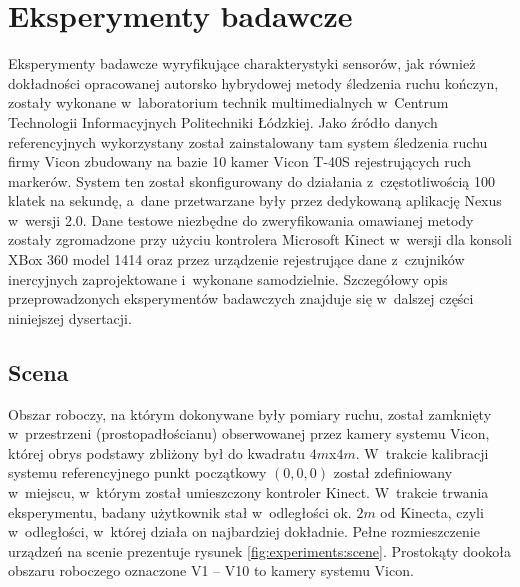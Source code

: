 \chapter{Eksperymenty badawcze}\label{chap:experiments}
Eksperymenty badawcze wyryfikujące charakterystyki sensorów, jak również dokładności opracowanej autorsko hybrydowej metody śledzenia ruchu kończyn, zostały wykonane w~laboratorium technik multimedialnych w~Centrum Technologii Informacyjnych Politechniki Łódzkiej. Jako źródło danych referencyjnych wykorzystany został zainstalowany tam system śledzenia ruchu firmy Vicon zbudowany na bazie 10 kamer Vicon T-40S  rejestrujących ruch markerów. System ten został skonfigurowany do działania z~częstotliwością 100 klatek na sekundę, a~dane przetwarzane były przez dedykowaną aplikację Nexus w~wersji 2.0. Dane testowe niezbędne do zweryfikowania omawianej metody zostały zgromadzone przy użyciu kontrolera Microsoft Kinect w~wersji dla konsoli XBox 360 model 1414 oraz przez urządzenie rejestrujące dane z~czujników inercyjnych zaprojektowane i~wykonane samodzielnie. Szczegółowy opis przeprowadzonych eksperymentów badawczych znajduje się w~dalszej części niniejszej dysertacji.

\section{Scena}
Obszar roboczy, na którym dokonywane były pomiary ruchu, został zamknięty w~przestrzeni (prostopadłościanu) obserwowanej przez kamery systemu Vicon, której obrys podstawy zbliżony był do kwadratu $4m$x$4m$. W~trakcie kalibracji systemu referencyjnego punkt początkowy $\left(0, 0, 0\right)$ został zdefiniowany w~miejscu, w~którym został umieszczony kontroler Kinect. W~trakcie trwania eksperymentu, badany użytkownik stał w~odległości ok. $2m$ od Kinecta, czyli w~odległości, w~której działa on najbardziej dokładnie.  Pełne rozmieszczenie urządzeń na scenie prezentuje rysunek \ref{fig:experiments:scene}. Prostokąty dookoła obszaru roboczego oznaczone V1 -- V10 to kamery systemu Vicon.

